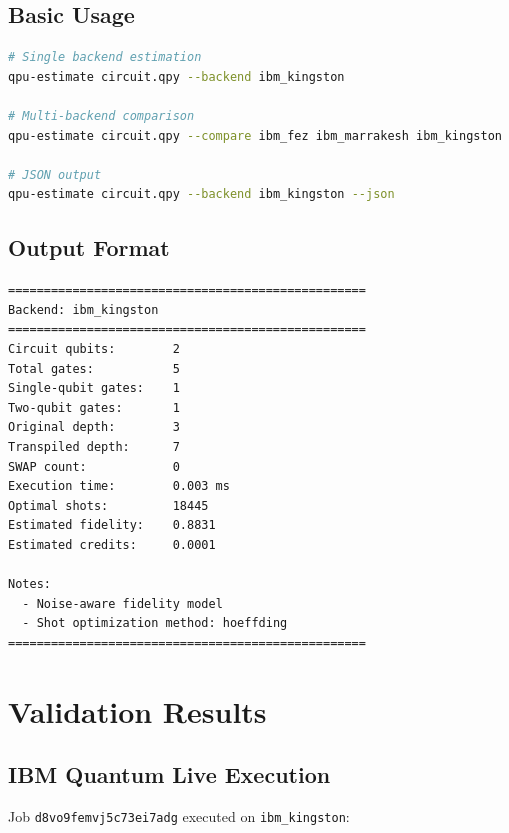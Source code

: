 \documentclass[11pt,a4paper]{article}
\begin{document}
\subsection{Basic Usage}

\begin{lstlisting}[language=bash,caption=CLI Examples]
# Single backend estimation
qpu-estimate circuit.qpy --backend ibm_kingston

# Multi-backend comparison
qpu-estimate circuit.qpy --compare ibm_fez ibm_marrakesh ibm_kingston

# JSON output
qpu-estimate circuit.qpy --backend ibm_kingston --json
\end{lstlisting}

\subsection{Output Format}

\begin{lstlisting}[language=bash,caption=Human-Readable Output]
==================================================
Backend: ibm_kingston
==================================================
Circuit qubits:        2
Total gates:           5
Single-qubit gates:    1
Two-qubit gates:       1
Original depth:        3
Transpiled depth:      7
SWAP count:            0
Execution time:        0.003 ms
Optimal shots:         18445
Estimated fidelity:    0.8831
Estimated credits:     0.0001

Notes:
  - Noise-aware fidelity model
  - Shot optimization method: hoeffding
==================================================
\end{lstlisting}

\section{Validation Results}

\subsection{IBM Quantum Live Execution}

Job \texttt{d8vo9femvj5c73ei7adg} executed on \texttt{ibm\_kingston}:
\end{document}
